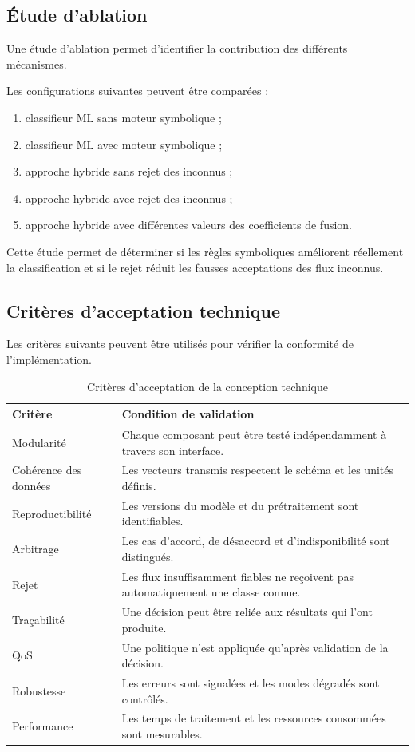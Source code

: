 \subsection{Étude d'ablation}

Une étude d'ablation permet d'identifier la contribution des différents mécanismes.

Les configurations suivantes peuvent être comparées :

\begin{enumerate}
    \item classifieur ML sans moteur symbolique ;
    \item classifieur ML avec moteur symbolique ;
    \item approche hybride sans rejet des inconnus ;
    \item approche hybride avec rejet des inconnus ;
    \item approche hybride avec différentes valeurs des coefficients de fusion.
\end{enumerate}

Cette étude permet de déterminer si les règles symboliques améliorent réellement la classification et si le rejet réduit les fausses acceptations des flux inconnus.

\subsection{Critères d'acceptation technique}

Les critères suivants peuvent être utilisés pour vérifier la conformité de l'implémentation.

\begin{table}[H]
\centering
\caption{Critères d'acceptation de la conception technique}
\label{tab:criteres_acceptation}
\small
\begin{tabularx}{\textwidth}{|X|X|}
\hline
\textbf{Critère} & \textbf{Condition de validation} \\
\hline
Modularité &
Chaque composant peut être testé indépendamment à travers son interface. \\
\hline
Cohérence des données &
Les vecteurs transmis respectent le schéma et les unités définis. \\
\hline
Reproductibilité &
Les versions du modèle et du prétraitement sont identifiables. \\
\hline
Arbitrage &
Les cas d'accord, de désaccord et d'indisponibilité sont distingués. \\
\hline
Rejet &
Les flux insuffisamment fiables ne reçoivent pas automatiquement une classe connue. \\
\hline
Traçabilité &
Une décision peut être reliée aux résultats qui l'ont produite. \\
\hline
QoS &
Une politique n'est appliquée qu'après validation de la décision. \\
\hline
Robustesse &
Les erreurs sont signalées et les modes dégradés sont contrôlés. \\
\hline
Performance &
Les temps de traitement et les ressources consommées sont mesurables. \\
\hline
\end{tabularx}
\end{table}

